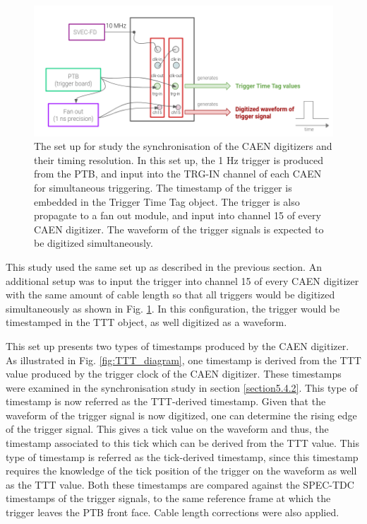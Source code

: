 \begin{figure}[htbp!] 
\centering    
\includegraphics[width=1.0\textwidth]{digitize_ftrig}
\caption[digitize_ftrig]{
The set up for study the synchronisation of the CAEN digitizers and their timing resolution.
In this set up, the 1 Hz trigger is produced from the PTB, and input into the TRG-IN channel of each CAEN for simultaneous triggering.
The timestamp of the trigger is embedded in the Trigger Time Tag object.
The trigger is also propagate to a fan out module, and input into channel 15 of every CAEN digitizer.
The waveform of the trigger signals is expected to be digitized simultaneously. 
}
\label{fig:digitize_ftrig}
\end{figure}

This study used the same set up as described in the previous section.
An additional setup was to input the trigger into channel 15 of every CAEN digitizer with the same amount of cable length so that all triggers would be digitized simultaneously as shown in Fig. \ref{fig:digitize_ftrig}.
In this configuration, the trigger would be timestamped in the TTT object, as well digitized as a waveform. 

This set up presents two types of timestamps produced by the CAEN digitizer.
As illustrated in Fig. \ref {fig:TTT_diagram}, one timestamp is derived from the TTT value produced by the trigger clock of the CAEN digitizer.
These timestamps were examined in the synchronisation study in section \ref{section5.4.2}.
This type of timestamp is now referred as the TTT-derived timestamp.
Given that the waveform of the trigger signal is now digitized, one can determine the rising edge of the trigger signal.
This gives a tick value on the waveform and thus, the timestamp associated to this tick which can be derived from the TTT value.
This type of timestamp is referred as the tick-derived timestamp, since this timestamp requires the knowledge of the tick position of the trigger on the waveform as well as the TTT value.
Both these timestamps are compared against the SPEC-TDC timestamps of the trigger signals, to the same reference frame at which the trigger leaves the PTB front face.
Cable length corrections were also applied.

